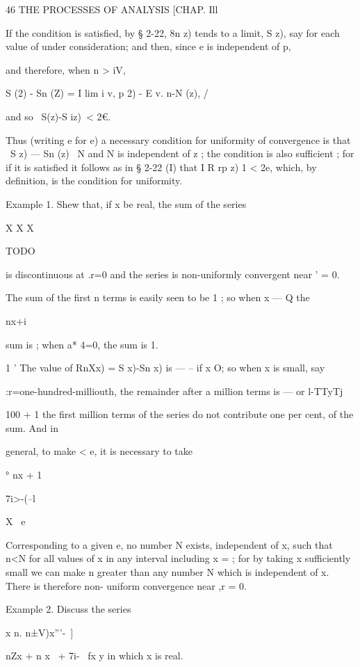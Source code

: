 46 THE PROCESSES OF ANALYSIS [CHAP. Ill 

If the condition is satisfied, by § 2-22, 8n z) tends to a limit, S z), say for 
each value of   under consideration; and then, since e is independent of p, 

and therefore, when n > iV, 

S (2) - Sn (Z) = I lim i v, p  2)  - E v. n-N (z), / 

and so \ S(z)-S iz)\ < 2€. 

Thus (writing  e for e) a necessary condition for uniformity of convergence 
is that \ S z) — Sn (z) \ < e, whenever n>N and N is independent of z ; the 
condition is also sufficient ; for if it is satisfied it follows as in § 2-22 (I) 
that I R rp z) 1 < 2e, which, by definition, is the condition for uniformity. 

Example 1. Shew that, if x be real, the sum of the series 

X X X 

TODO

is discontinuous at .r=0 and the series is non-uniformly convergent near  ' = 0. 

The sum of the first n terms is easily seen to be 1 ; so when x — Q the 

nx+i 

sum is ; when a* 4=0, the sum is 1. 

1 ' 
The value of RnXx) = S x)-Sn x) is — -- if x O; so when x is small, say 

:r=one-hundred-milliouth, the remainder after a million terms is — or l-TTyTj   

100 + 1 
the first million terms of the series do not contribute one per cent, of the sum. And in 

general, to make < e, it is necessary to take 

° nx + 1 

7i>-(--l 

X \ e 

Corresponding to a given e, no number N exists, independent of x, such that n<N for 
all values of x in any interval including x = ; for by taking x sufficiently small we can 
make n greater than any number N which is independent of x. There is therefore non- 
uniform convergence near ,r = 0. 

Example 2. Discuss the series 

x n. n±V)x'''-\ ]  



nZx   + n x   \ +  7i- \ fx y 
in which x is real. 

